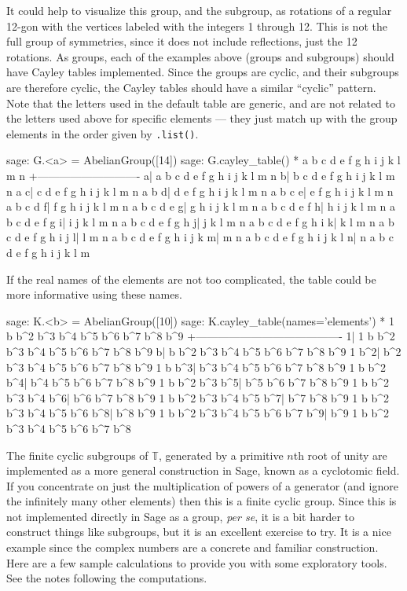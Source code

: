 %
It could help to visualize this group, and the subgroup, as rotations of a regular 12-gon with the vertices labeled with the integers 1 through 12.  This is not the full group of symmetries, since it does not include reflections, just the 12 rotations.
%
%
As groups, each of the examples above (groups and subgroups) should have Cayley tables implemented.  Since the groups are cyclic, and their subgroups are therefore cyclic, the Cayley tables should have a similar ``cyclic'' pattern.  Note that the letters used in the default table are generic, and are not related to the letters used above for specific elements --- they just match up with the group elements in the order given by \verb?.list()?.
%
\begin{sageexample}
sage: G.<a> = AbelianGroup([14])
sage: G.cayley_table()
*  a b c d e f g h i j k l m n
 +----------------------------
a| a b c d e f g h i j k l m n
b| b c d e f g h i j k l m n a
c| c d e f g h i j k l m n a b
d| d e f g h i j k l m n a b c
e| e f g h i j k l m n a b c d
f| f g h i j k l m n a b c d e
g| g h i j k l m n a b c d e f
h| h i j k l m n a b c d e f g
i| i j k l m n a b c d e f g h
j| j k l m n a b c d e f g h i
k| k l m n a b c d e f g h i j
l| l m n a b c d e f g h i j k
m| m n a b c d e f g h i j k l
n| n a b c d e f g h i j k l m
\end{sageexample}
%
If the real names of the elements are not too complicated, the table could be more informative using these names.
%
\begin{sageexample}
sage: K.<b> = AbelianGroup([10])
sage: K.cayley_table(names='elements')
  *    1   b b^2 b^3 b^4 b^5 b^6 b^7 b^8 b^9
   +----------------------------------------
  1|   1   b b^2 b^3 b^4 b^5 b^6 b^7 b^8 b^9
  b|   b b^2 b^3 b^4 b^5 b^6 b^7 b^8 b^9   1
b^2| b^2 b^3 b^4 b^5 b^6 b^7 b^8 b^9   1   b
b^3| b^3 b^4 b^5 b^6 b^7 b^8 b^9   1   b b^2
b^4| b^4 b^5 b^6 b^7 b^8 b^9   1   b b^2 b^3
b^5| b^5 b^6 b^7 b^8 b^9   1   b b^2 b^3 b^4
b^6| b^6 b^7 b^8 b^9   1   b b^2 b^3 b^4 b^5
b^7| b^7 b^8 b^9   1   b b^2 b^3 b^4 b^5 b^6
b^8| b^8 b^9   1   b b^2 b^3 b^4 b^5 b^6 b^7
b^9| b^9   1   b b^2 b^3 b^4 b^5 b^6 b^7 b^8
\end{sageexample}
%
%
The finite cyclic subgroups of ${\mathbb T}$, generated by a primitive $n$th root of unity are implemented as a more general construction in Sage, known as a cyclotomic field.  If you concentrate on just the multiplication of powers of a generator (and ignore the infinitely many other elements) then this is a finite cyclic group.  Since this is not implemented directly in Sage as a group, {\it per se}, it is a bit harder to construct things like subgroups, but it is an excellent exercise to try.  It is a nice example since the complex numbers are a concrete and familiar construction.  Here are a few sample calculations to provide you with some exploratory tools.  See the notes following the computations.
